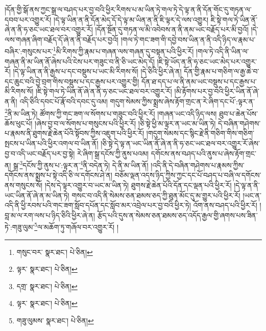 །དོན་གྱི་སྒོ་ནས་ཀྱང་སྒྲ་ལ་བཤད་པར་བྱ་བའི་ཕྱིར་རིགས་པ་མ་ཡིན་ཏེ་གལ་ཏེ་དེ་ལྟ་ན་ནི་དོན་གོང་དུ་གཏན་ལ་དབབ་པར་འགྱུར་རོ། །དེ་ལྟ་ཡིན་ན་ནི་དོན་མེད་དོ་དེ་ལྟ་མ་ཡིན་ན་ནི་ཇི་ལྟར་དེ་ལས་འགྱུར། ཇི་སྟེ་གལ་ཏེ་ཡིན་ནོ་ཞེ་ན་ནི་ཧ་ཅང་ཡང་ཐལ་བར་འགྱུར་རོ། །དོན་སྔོན་དུ་གཏན་ལ་མི་འབེབས་ན་ནི་ནམ་ཡང་བརྗོད་པར་མི་བྱའོ། །དེ་ལས་གཞན་ཞིག་བརྗོད་དོ་ཞེ་ན་ནི་བརྗོད་པར་བྱའོ། །གལ་ཏེ་གང་ཟག་གི་དབྱེ་བས་ཡིན་ན་ནི་འདི་ཉིད་ལ་རྣམ་པ་བཞིར་:གསུངས་པར་\footnote{གསུང་བར་  སྣར་ཐང་།  པེ་ཅིན། }མི་རིགས་ཀྱི་རྣམ་པ་གཞན་ལས་གཞན་དུ་བསྟན་པའི་ཕྱིར་རོ། །གལ་ཏེ་འདི་ནི་ཡིན་ལ་གཞན་ནི་མ་ཡིན་ནོ་ཞེས་པའི་ངེས་པར་གཟུང་བ་ནི་ཅི་ཡང་མེད་དོ། །ཇི་སྟེ་ཡོད་ན་ནི་ཧ་ཅང་ཡང་མེད་པར་འགྱུར་རོ། །དེ་ལྟ་ཡིན་ན་ནི་རྒྱས་པ་དང་བསྡུས་པ་ཡང་མི་རིགས་སོ། །དེ་ཅིའི་ཕྱིར་ཞེ་ན། དོན་གྱི་རྣམ་པ་གཅིག་ལ་རྒྱ་ཆེ་བ་དང་ཆུང་བའི་བྱེ་བྲག་གིས་བསྡུས་པ་དང་རྒྱས་པར་འགྱུར་གྱི། དོན་ཐ་དད་པ་ལ་ནི་ནམ་ཡང་བསྡུས་པ་དང་རྒྱས་པ་མི་རིགས་སོ། །ཇི་སྟེ་གལ་ཏེ་ཡིན་ནོ་ཞེ་ན་ནི་ཧ་ཅང་ཡང་ཐལ་བར་འགྱུར་རོ། །མི་རྟོགས་པར་བྱ་བའི་ཕྱིར་ཡིན་ནོ་ཞེ་ན་ནི། འདི་ཅིའི་དབང་པོ་རྣོ་བའི་དབང་དུ་འམ། གདུག་སེམས་ཀྱིས་སྨྲས་ཞེས་རྟོག་གྲང་ན་རེ་ཞིག་དང་པོ་:ལྟར་ན་\footnote{ལྟར་  སྣར་ཐང་།  པེ་ཅིན། }ནི་མ་ཡིན་ཏེ། ཚོགས་ཀྱི་གང་ཟག་ལ་སོགས་པ་གཟུང་བའི་ཕྱིར་རོ། །གཞན་ཡང་འདི་ཉིད་ལས། ཐུབ་པ་ཆེན་པོས་ཆོས་ཕུང་པོ། །ཞེས་བྱ་བ་ལ་སོགས་པ་གསུངས་པའི་ཕྱིར་རོ། །ཅི་སྟེ་ཕྱི་མ་ལྟར་ན་ཡང་མ་ཡིན་ཏེ། དེ་བཞིན་གཤེགས་པ་རྣམས་ནི་ཐུགས་རྗེ་ཆེན་པོའི་སྟོབས་ཀྱིས་འཇུག་པའི་ཕྱིར་རོ། །གདུག་སེམས་དང་སྙིང་རྗེ་ནི་གཅིག་གིས་གཅིག་སྤངས་པ་ཡིན་པའི་ཕྱིར་འགལ་བ་ཡིན་ནོ། །ཅི་སྟེ་དེ་ལྟ་ན་ཡང་ཡིན་ནོ་ཞེ་ན་ནི་ཧ་ཅང་ཡང་ཐལ་བར་འགྱུར་རོ་ཞེས་བྱ་བ་འདི་ཡང་བརྗོད་པར་བྱ་སྟེ། རེ་ཞིག་སྒྲ་དངོས་ཀྱི་ནུས་པའམ། དགོངས་ནས་བཤད་པའི་ནུས་པ་ཞེས་རྟོག་གྲང་ན། སྒྲ་\footnote{དགྲ་  སྣར་ཐང་།  པེ་ཅིན། }དངོས་ཀྱི་ནུས་པ་:ལྟར་ན་\footnote{ལྟར་  སྣར་ཐང་།  པེ་ཅིན། }ནི་བདེན་ཏེ། དེ་ནི་མ་ཡིན་ནོ། །འདི་ནི་དེ་བཞིན་གཤེགས་པ་རྣམས་ཀྱིས་དགོངས་ནས་སྨྲས་པ་སྟེ་འདི་ཅི་ལ་དགོངས་ཤེ་ན། བཅོམ་ལྡན་འདས་ཉིད་ཀྱིས་ཀྱང་དང་པོ་བཤད་པ་བཞི་ལ་དགོངས་ནས་གསུངས་སོ། །དེས་དེ་ལྟར་འགྱུར་བ་ཡང་མ་ཡིན་ཏེ། ཐུགས་རྗེ་ཆེན་པོའི་དོན་དང་ལྡན་པའི་ཕྱིར་རོ། །དེ་ལྟ་ན་ནི་ཡང་ཡིན་ནོ་ཞེ་ན་མ་ཡིན་ཏེ། གསང་བ་འདི་ནི་སེམས་ཅན་ཐམས་ཅད་ཀྱི་ཐུན་མོང་དུ་མ་གྱུར་པའི་ཕྱིར་རོ། །ཡང་ན་འདི་ནི་ཕྱི་རབས་པའི་གང་ཟག་སློབ་དཔོན་དང་སློབ་མར་འབྲེལ་པར་བྱ་བའི་ཕྱིར་ཏེ། འོག་ནས་བཤད་པའི་ཕྱིར་རོ། །བླ་མ་ལ་རག་ལས་པ་ཉིད་ཅིའི་ཕྱིར་ཞེ་ན། རྩོད་པའི་དུས་ན་སེམས་ཅན་ཐམས་ཅད་འདོད་རྒྱལ་གྱི་ཞགས་པས་ཟིན་ཏེ་:གཟུ་ལུམ་\footnote{གཟུ་ལུམས་  སྣར་ཐང་།  པེ་ཅིན། }ལ་མཆོག་ཏུ་གཞོལ་བར་འགྱུར་རོ། །
